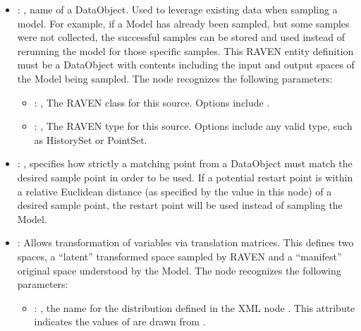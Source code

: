 \begin{itemize}
    \item {}: , 
      name of a DataObject. Used to leverage existing data when sampling a model. For
      example, if a Model has               already been sampled, but some samples were not
      collected, the successful samples can               be stored and used instead of rerunning
      the model for those specific samples. This RAVEN               entity definition must be a
      DataObject with contents including the input and output spaces               of the Model
      being sampled.
      The  node recognizes the following parameters:
        \begin{itemize}
          \item {}: , 
            The RAVEN class for this source. Options include .
          \item {}: , 
            The RAVEN type for this source. Options include any valid  type,
            such as HistorySet or PointSet.
      \end{itemize}

    \item {}: , 
      specifies how strictly a matching point from a  DataObject must match
      the desired sample point in order to be used. If a potential restart point is within a
      relative Euclidean distance (as specified by the value in this node) of a desired sample
      point,               the restart point will be used instead of sampling the Model.

    \item {}:
      Allows transformation of variables via translation matrices. This defines two spaces,
      a ``latent'' transformed space sampled by RAVEN and a ``manifest'' original space understood
      by the Model.
      The  node recognizes the following parameters:
        \begin{itemize}
          \item {}: , 
            the name for the distribution defined in the XML node .
            This attribute indicates the values of  are drawn from
            .
      \end{itemize}


\end{itemize}
